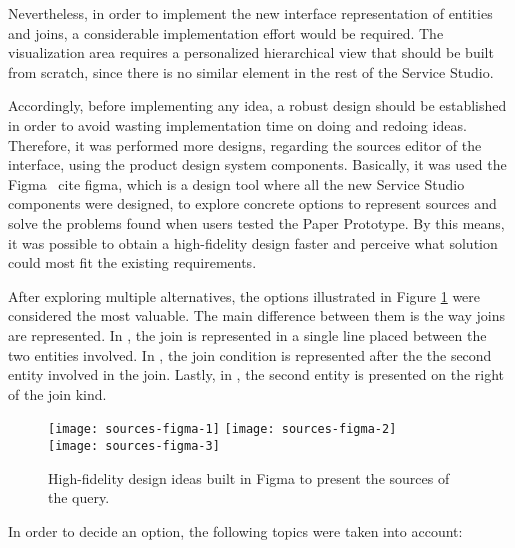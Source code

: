 Nevertheless, in order to implement the new interface representation of entities and joins, a considerable implementation effort would be required. The visualization area requires a personalized hierarchical view that should be built from scratch, since there is no similar element in the rest of the Service Studio.

Accordingly, before implementing any idea, a robust design should be established in order to avoid wasting implementation time on doing and redoing ideas. Therefore, it was performed more designs, regarding the sources editor of the interface, using the product design system components. Basically, it was used the Figma \ cite {figma}, which is a design tool where all the new Service Studio components were designed, to explore concrete options to represent sources and solve the problems found when users tested the Paper Prototype. By this means, it was possible to obtain a high-fidelity design faster and perceive what solution could most fit the existing requirements.

After exploring multiple alternatives, the options illustrated in Figure \ref{fig:sourcesFigma} were considered the most valuable. The main difference between them is the way joins are represented. In , the join is represented in a single line placed between the two entities involved. In , the join condition is represented after the the second entity involved in the join. Lastly, in , the second entity is presented on the right of the join kind.

\begin{figure}[tb]
  \centering
    {\texttt{[image: sources-figma-1]}}%
    {\texttt{[image: sources-figma-2]}}%
    \\
  {\texttt{[image: sources-figma-3]}}%
\caption{High-fidelity design ideas built in Figma to present the sources of the query.}
  \label{fig:sourcesFigma}
\end{figure}

In order to decide an option, the following topics were taken into account:

